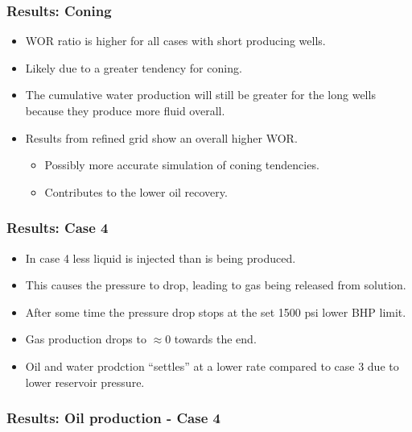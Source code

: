 \begin{frame}
    \frametitle{Results: Coning}
    \begin{itemize}
        \item WOR ratio is higher for all cases with short producing wells.
        \item Likely due to a greater tendency for coning.
        \item The cumulative water production will still be greater for the long wells because they produce more fluid overall.
        \pause
        \item Results from refined grid show an overall higher WOR.
        \begin{itemize}
            \item Possibly more accurate simulation of coning tendencies.
            \item Contributes to the lower oil recovery.
        \end{itemize}
    \end{itemize}
\end{frame}


\begin{frame}
    \frametitle{Results: Case 4}
    \begin{itemize}
        \item In case 4 less liquid is injected than is being produced.
        \item This causes the pressure to drop, leading to gas being released from solution.
        \item After some time the pressure drop stops at the set 1500 psi lower BHP limit.
        \item Gas production drops to $\approx 0$ towards the end.
        \item Oil and water prodction ``settles'' at a lower rate compared to case 3 due to lower reservoir pressure.
    \end{itemize}
\end{frame}


\begin{frame}
    \frametitle{Results: Oil production - Case 4}
    \centerline{}
\end{frame}

